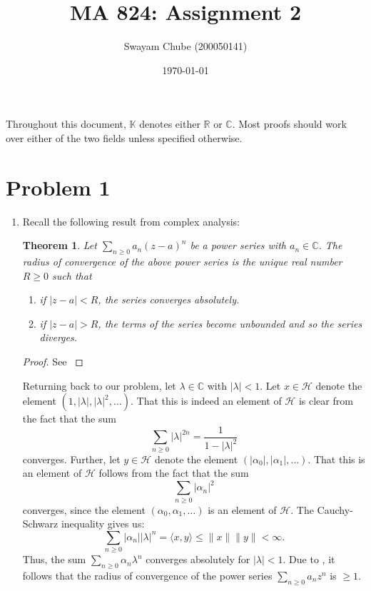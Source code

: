 \documentclass[10pt]{amsart}
\title{MA 824: Assignment 2}
\author{Swayam Chube (200050141)}
\date{\today}
\theoremstyle{thmstyle}
\newtheorem{theorem}{Theorem}[section]
\theoremstyle{defstyle}
\newcommand{\R}{\mathbb{R}}
\newcommand{\bbC}{\mathbb{C}}
\newcommand{\K}{\mathbb{K}}
\newcommand{\calH}{\mathcal{H}} %
\renewcommand{\le}{\leqslant}
\renewcommand{\ge}{\geqslant}
\begin{document}
\maketitle 

Throughout this document, $\K$ denotes either $\R$ or $\bbC$. Most proofs should work over either of the two fields unless specified otherwise.

\section{Problem 1}
\begin{enumerate}[label=(\alph*)]
\item Recall the following result from complex analysis: 
\begin{theorem}
    Let $\displaystyle\sum_{n\ge 0} a_n(z - a)^n$ be a power series with $a_n\in\bbC$. The radius of convergence of the above power series is the unique real number $R\ge 0$ such that
    \begin{enumerate}[label=(\roman*)]
        \item if $|z - a| < R$, the series converges absolutely. 
        \item if $|z - a| > R$, the terms of the series become unbounded and so the series diverges.
    \end{enumerate}
\end{theorem}
\begin{proof}
    See \cite[Theorem III.1.3]{conway-complex}
\end{proof}
Returning back to our problem, let $\lambda\in\bbC$ with $|\lambda| < 1$. Let $x\in\calH$ denote the element $(1,|\lambda|,|\lambda|^2,\dots)$. That this is indeed an element of $\calH$ is clear from the fact that the sum
\begin{equation*}
    \sum_{n\ge 0} |\lambda|^{2n} = \frac{1}{1 - |\lambda|^2}
\end{equation*}
converges. Further, let $y\in\calH$ denote the element $(|\alpha_0|,|\alpha_1|,\dots)$. That this is an element of $\calH$ follows from the fact that the sum 
\begin{equation*}
    \sum_{n\ge 0} |\alpha_n|^2
\end{equation*}
converges, since the element $(\alpha_0,\alpha_1,\dots)$ is an element of $\calH$. The Cauchy-Schwarz inequality gives us: 
\begin{equation*}
    \sum_{n\ge 0}|\alpha_n||\lambda|^n = \langle x, y\rangle\le\|x\|\|y\| < \infty.
\end{equation*}
Thus, the sum $\sum_{n\ge 0}\alpha_n\lambda^n$ converges absolutely for $|\lambda| < 1$. Due to , it follows that the radius of convergence of the power series $\sum_{n\ge 0}a_nz^n$ is $\ge 1$.


\end{enumerate}
\end{document}
